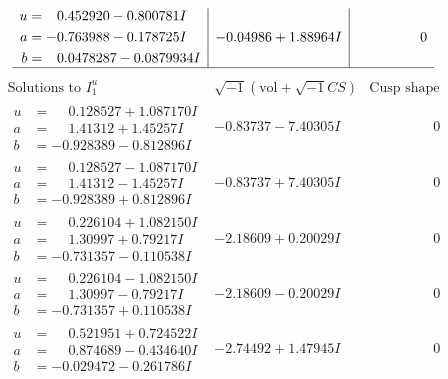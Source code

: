 \documentclass[1p]{elsarticle_modified}
\theoremstyle{definition}
\newcommand{\I}{\sqrt{-1}}
\begin{document}
$$\begin{array}{c|c|c}
\begin{aligned}
u &= \phantom{-}0.452920 - 0.800781 I \\
a &= -0.763988 - 0.178725 I \\
b &= \phantom{-}0.0478287 - 0.0879934 I\end{aligned}
 & -0.04986 + 1.88964 I & \phantom{-0.000000 } 0\\
 \hline 
 \end{array}$$\newpage$$\begin{array}{c|c|c}  
\text{Solutions to }I^u_{1}& \I (\text{vol} + \sqrt{-1}CS) & \text{Cusp shape}\\
 \hline 
\begin{aligned}
u &= \phantom{-}0.128527 + 1.087170 I \\
a &= \phantom{-}1.41312 + 1.45257 I \\
b &= -0.928389 - 0.812896 I\end{aligned}
 & -0.83737 - 7.40305 I & \phantom{-0.000000 } 0 \\ \hline\begin{aligned}
u &= \phantom{-}0.128527 - 1.087170 I \\
a &= \phantom{-}1.41312 - 1.45257 I \\
b &= -0.928389 + 0.812896 I\end{aligned}
 & -0.83737 + 7.40305 I & \phantom{-0.000000 } 0 \\ \hline\begin{aligned}
u &= \phantom{-}0.226104 + 1.082150 I \\
a &= \phantom{-}1.30997 + 0.79217 I \\
b &= -0.731357 - 0.110538 I\end{aligned}
 & -2.18609 + 0.20029 I & \phantom{-0.000000 } 0 \\ \hline\begin{aligned}
u &= \phantom{-}0.226104 - 1.082150 I \\
a &= \phantom{-}1.30997 - 0.79217 I \\
b &= -0.731357 + 0.110538 I\end{aligned}
 & -2.18609 - 0.20029 I & \phantom{-0.000000 } 0 \\ \hline\begin{aligned}
u &= \phantom{-}0.521951 + 0.724522 I \\
a &= \phantom{-}0.874689 - 0.434640 I \\
b &= -0.029472 - 0.261786 I\end{aligned}
 & -2.74492 + 1.47945 I & \phantom{-0.000000 } 0 \\ \hline\begin{aligned}

\end{aligned}
\end{array}$$
\end{document}
